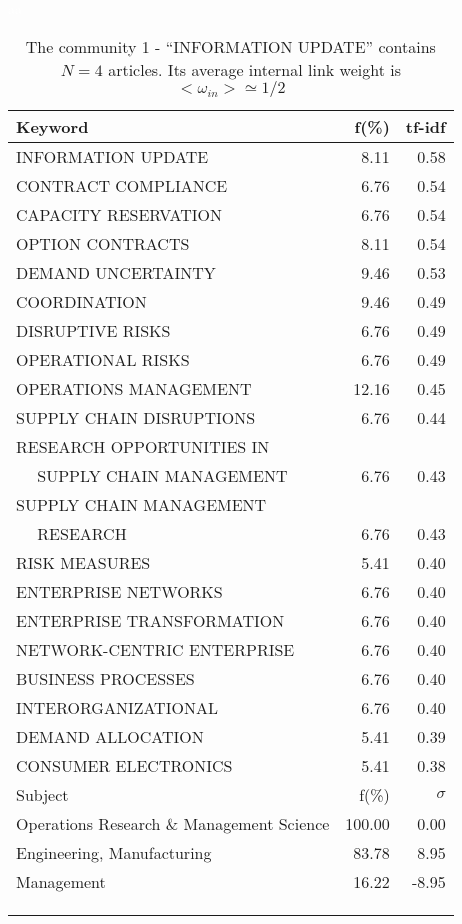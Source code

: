 \documentclass[a4paper,11pt]{report}
\begin{document}
\begin{landscape}
\clearpage

\begin{table}[!ht]
\caption{The community 1 - ``INFORMATION UPDATE'' contains $N = 4$ articles. Its average internal link weight is $<\omega_{in}> \simeq 1/2$ }
\textcolor{white}{aa}\\
{\scriptsize\begin{tabular}{|l r  r|}
\hline
Keyword & f(\%) & tf-idf \\
\hline
INFORMATION UPDATE & 8.11 & 0.58\\
CONTRACT COMPLIANCE & 6.76 & 0.54\\
CAPACITY RESERVATION & 6.76 & 0.54\\
OPTION CONTRACTS & 8.11 & 0.54\\
DEMAND UNCERTAINTY & 9.46 & 0.53\\
COORDINATION & 9.46 & 0.49\\
DISRUPTIVE RISKS & 6.76 & 0.49\\
OPERATIONAL RISKS & 6.76 & 0.49\\
OPERATIONS MANAGEMENT & 12.16 & 0.45\\
SUPPLY CHAIN DISRUPTIONS & 6.76 & 0.44\\
RESEARCH OPPORTUNITIES IN &  &\\
$\quad$ SUPPLY CHAIN MANAGEMENT & 6.76 & 0.43\\
SUPPLY CHAIN MANAGEMENT &  &\\
$\quad$ RESEARCH & 6.76 & 0.43\\
RISK MEASURES & 5.41 & 0.40\\
ENTERPRISE NETWORKS & 6.76 & 0.40\\
ENTERPRISE TRANSFORMATION & 6.76 & 0.40\\
NETWORK-CENTRIC ENTERPRISE & 6.76 & 0.40\\
BUSINESS PROCESSES & 6.76 & 0.40\\
INTERORGANIZATIONAL & 6.76 & 0.40\\
DEMAND ALLOCATION & 5.41 & 0.39\\
CONSUMER ELECTRONICS & 5.41 & 0.38\\
\hline
\hline
Subject & f(\%) & $\sigma$\\
\hline
Operations Research \& Management Science & 100.00 & 0.00\\
Engineering, Manufacturing & 83.78 & 8.95\\
Management & 16.22 & -8.95\\
 &  & \\
 &  & \\
 &  & \\

\end{tabular}}
\end{table}
\end{landscape}
\end{document}
